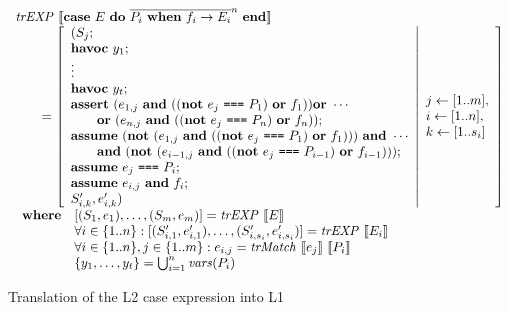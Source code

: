 \begin{figure}
\[
\begin{array}{l}
\mathit{trEXP}~\llbracket\textbf{case}~E~\textbf{do}~\overline{P_i~\textbf{when}~f_i \rightarrow E_i}^n~\textbf{end}\rrbracket\\
\qquad = \left[ \begin{array}{l}
(S_j;\\
\textbf{havoc}~y_{1};\\
\vdots\\
\textbf{havoc}~y_{t};\\
\textbf{assert}~(e_{1,j}~\textbf{and}~((\textbf{not}~e_j~\texttt{===}~P_1)~\textbf{or}~f_1))\textbf{or}~\cdots\\
\quad\quad\textbf{or}~(e_{n,j}~\textbf{and}~((\textbf{not}~e_j~\texttt{===}~P_n)~\textbf{or}~f_n)); \\
\textbf{assume}~(\textbf{not}~(e_{1,j}~\textbf{and}~((\textbf{not}~e_j~\texttt{===}~P_1)~\textbf{or}~f_1)))~\textbf{and}~\cdots\\
\quad\quad\textbf{and}~(\textbf{not}~(e_{i-1,j}~\textbf{and}~((\textbf{not}~e_j~\texttt{===}~P_{i - 1})~\textbf{or}~f_{i - 1}))); \\
\textbf{assume}~e_j~\texttt{===}~P_i; \\
\textbf{assume}~e_{i,j}~\textbf{and}~f_{i};\\
S_{i,k}', e_{i,k}')
\end{array}  \middle\vert
\begin{array}{l}
j \leftarrow [1..m], \\
i \leftarrow [1..n], \\
k \leftarrow [1..s_i] \\
\end{array}
\right]\\
\begin{array}{ll}
\textbf{where} & [(S_1,e_1),\ldots,(S_m,e_m)] = \mathit{trEXP}~\llbracket E\rrbracket \\
& \forall i \in \{1..n\}: [(S'_{i,1},e'_{i,1}),\ldots,(S'_{i,s_i},e'_{i,s_i})] = \mathit{trEXP}~\llbracket E_i\rrbracket \\
& \forall i \in \{1..n\}, j \in \{1..m\}: e_{i,j} = \mathit{trMatch}~\llbracket e_j\rrbracket~\llbracket P_i\rrbracket \\
& \{y_{1}, \ldots, y_{t}\} = \bigcup_{i = 1}^n\mathit{vars}(P_i) \\
\end{array}
\end{array}
\]
\caption{Translation of the L2 case expression into L1}
\label{fig:casetr}
\end{figure}

